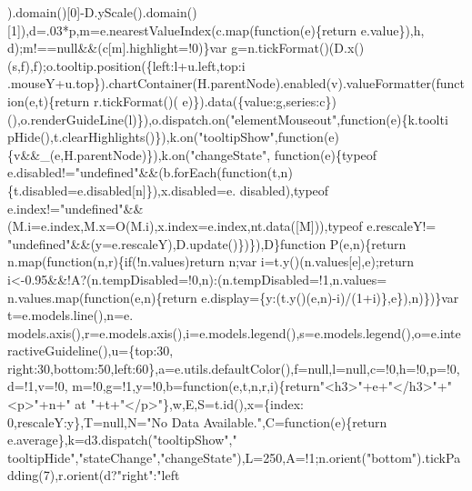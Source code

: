 \begin{DoxyCode}
      ).domain()[0]-D.yScale().domain()[1]),d=.03*p,m=e.nearestValueIndex(c.map(\textcolor{keyword}{function}(e)\{return e.value\}),h,
      d);m!==null&&(c[m].highlight=!0)\}var g=n.tickFormat()(D.x()(s,f),f);o.tooltip.position(\{left:l+u.left,top:i
      .mouseY+u.top\}).chartContainer(H.parentNode).enabled(v).valueFormatter(\textcolor{keyword}{function}(e,t)\{\textcolor{keywordflow}{return} r.tickFormat()(
      e)\}).data(\{value:g,series:c\})(),o.renderGuideLine(l)\}),o.dispatch.on(\textcolor{stringliteral}{"elementMouseout"},\textcolor{keyword}{function}(e)\{k.toolti
      pHide(),t.clearHighlights()\}),k.on(\textcolor{stringliteral}{"tooltipShow"},\textcolor{keyword}{function}(e)\{v&&\_(e,H.parentNode)\}),k.on(\textcolor{stringliteral}{"changeState"},\textcolor{keyword}{
      function}(e)\{typeof e.disabled!=\textcolor{stringliteral}{"undefined"}&&(b.forEach(function(t,n)\{t.disabled=e.disabled[n]\}),x.disabled=e.
      disabled),typeof e.index!=\textcolor{stringliteral}{"undefined"}&&(M.i=e.index,M.x=O(M.i),x.index=e.index,nt.data([M])),typeof e.rescaleY!=\textcolor{stringliteral}{
      "undefined"}&&(y=e.rescaleY),D.update()\})\}),D\}\textcolor{keyword}{function} P(e,n)\{\textcolor{keywordflow}{return} n.map(\textcolor{keyword}{function}(n,r)\{\textcolor{keywordflow}{if}(!n.values)\textcolor{keywordflow}{return} 
      n;var i=t.y()(n.values[e],e);\textcolor{keywordflow}{return} i<-0.95&&!A?(n.tempDisabled=!0,n):(n.tempDisabled=!1,n.values=
n.values.map(\textcolor{keyword}{function}(e,n)\{return e.display=\{y:(t.y()(e,n)-i)/(1+i)\},e\}),n)\})\}var t=e.models.line(),n=e.
      models.axis(),r=e.models.axis(),i=e.models.legend(),s=e.models.legend(),o=e.interactiveGuideline(),u=\{top:30,
      right:30,bottom:50,left:60\},a=e.utils.defaultColor(),f=null,l=null,c=!0,h=!0,p=!0,d=!1,v=!0,
      m=!0,g=!1,y=!0,b=\textcolor{keyword}{function}(e,t,n,r,i)\{\textcolor{keywordflow}{return}\textcolor{stringliteral}{"<h3>"}+e+\textcolor{stringliteral}{"</h3>"}+\textcolor{stringliteral}{"<p>"}+n+\textcolor{stringliteral}{" at "}+t+\textcolor{stringliteral}{"</p>"}\},w,E,S=t.id(),x=\{index:
      0,rescaleY:y\},T=null,N=\textcolor{stringliteral}{"No Data Available."},C=\textcolor{keyword}{function}(e)\{\textcolor{keywordflow}{return} e.average\},k=d3.dispatch(\textcolor{stringliteral}{"tooltipShow"},\textcolor{stringliteral}{"
      tooltipHide"},\textcolor{stringliteral}{"stateChange"},\textcolor{stringliteral}{"changeState"}),L=250,A=!1;n.orient(\textcolor{stringliteral}{"bottom"}).tickPadding(7),r.orient(d?\textcolor{stringliteral}{"right"}:\textcolor{stringliteral}{"left
}
\end{DoxyCode}
